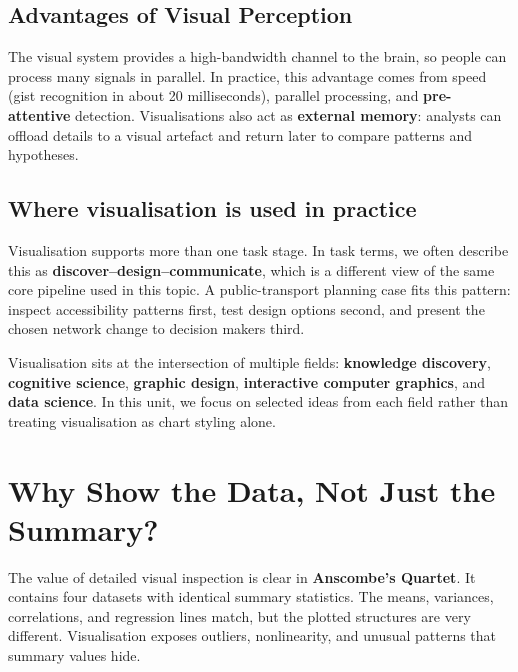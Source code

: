 
\subsection*{Advantages of Visual Perception}
The visual system provides a high-bandwidth channel to the brain, so people can process many signals in parallel. In practice, this advantage comes from speed (gist recognition in about 20 milliseconds), parallel processing, and \textbf{pre-attentive} detection. Visualisations also act as \textbf{external memory}: analysts can offload details to a visual artefact and return later to compare patterns and hypotheses.

\subsection*{Where visualisation is used in practice}
Visualisation supports more than one task stage. In task terms, we often describe this as \textbf{discover--design--communicate}, which is a different view of the same core pipeline used in this topic. A public-transport planning case fits this pattern: inspect accessibility patterns first, test design options second, and present the chosen network change to decision makers third.

Visualisation sits at the intersection of multiple fields: \textbf{knowledge discovery}, \textbf{cognitive science}, \textbf{graphic design}, \textbf{interactive computer graphics}, and \textbf{data science}. In this unit, we focus on selected ideas from each field rather than treating visualisation as chart styling alone.

\section{Why Show the Data, Not Just the Summary?}



The value of detailed visual inspection is clear in \textbf{Anscombe's Quartet}. It contains four datasets with identical summary statistics. The means, variances, correlations, and regression lines match, but the plotted structures are very different. Visualisation exposes outliers, nonlinearity, and unusual patterns that summary values hide.


